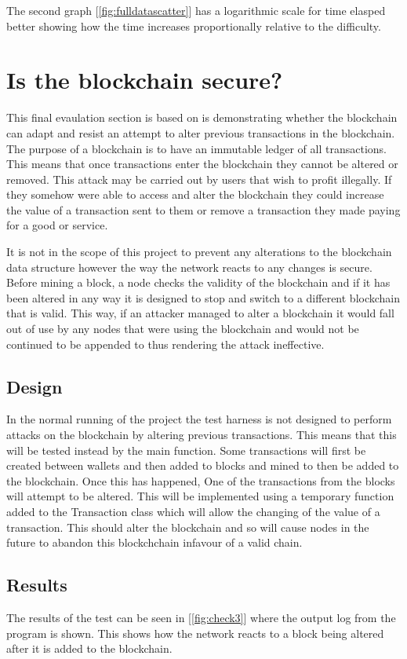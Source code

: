 \documentclass{l4proj}
\begin{document}
The second graph [\ref{fig:fulldatascatter}] has a logarithmic scale for time elasped better showing how the 
time increases proportionally relative to the difficulty.


\section{Is the blockchain secure?}
This final evaulation section is based on is demonstrating whether the blockchain can adapt and resist an attempt to 
alter previous transactions in the blockchain. The purpose of a blockchain is to have an immutable ledger of all transactions.
This means that once transactions enter the blockchain they cannot be altered or removed. This attack may be carried out
by users that wish to profit illegally. If they somehow were able to access and alter the blockchain they could increase
the value of a transaction sent to them or remove a transaction they made paying for a good or service.

It is not in the scope of this project to prevent any alterations to the blockchain data structure however the way the
network reacts to any changes is secure. Before mining a block, a node checks the validity of the blockchain and if it
has been altered in any way it is designed to stop and switch to a different blockchain that is valid. This way, if an
attacker managed to alter a blockchain it would fall out of use by any nodes that were using the blockchain and would
not be continued to be appended to thus rendering the attack ineffective.
\subsection{Design}
In the normal running of the project the test harness is not designed to perform attacks on the blockchain by altering
previous transactions. This means that this will be tested instead by the main function. Some transactions will first
be created between wallets and then added to blocks and mined to then be added to the blockchain. Once this has happened,
One of the transactions from the blocks will attempt to be altered. This will be implemented using a temporary function
added to the Transaction class which will allow the changing of the value of a transaction. This should alter the 
blockchain and so will cause nodes in the future to abandon this blockchchain infavour of a valid chain.

\subsection{Results}
The results of the test can be seen in [\ref{fig:check3}] where the output log from the program is shown. This shows
how the network reacts to a block being altered after it is added to the blockchain.
\end{document}
